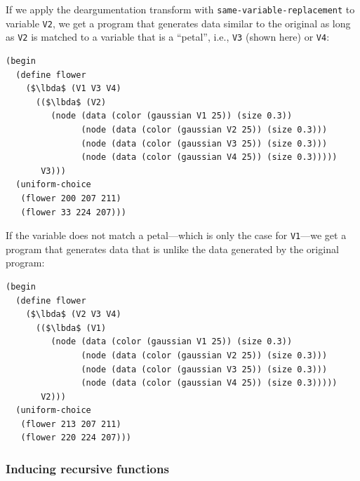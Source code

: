 \documentclass[a4paper,10pt]{article}
\newcommand{\lbda}{\color[rgb]{0,.3,.7} \lambda}
\begin{document}
If we apply the deargumentation transform with \texttt{same-variable-replacement} to variable \texttt{V2}, we get a program that generates data similar to the original as long as \texttt{V2} is matched to a variable that is a ``petal'', i.e., \texttt{V3} (shown here) or \texttt{V4}:

\begin{lstlisting}[mathescape=true]
(begin
  (define flower
    ($\lbda$ (V1 V3 V4)
      (($\lbda$ (V2)
         (node (data (color (gaussian V1 25)) (size 0.3))
               (node (data (color (gaussian V2 25)) (size 0.3)))
               (node (data (color (gaussian V3 25)) (size 0.3)))
               (node (data (color (gaussian V4 25)) (size 0.3)))))
       V3)))
  (uniform-choice
   (flower 200 207 211)
   (flower 33 224 207)))
\end{lstlisting}

If the variable does not match a petal---which is only the case for \texttt{V1}---we get a program that generates data that is unlike the data generated by the original program:

\begin{lstlisting}[mathescape=true]
(begin
  (define flower
    ($\lbda$ (V2 V3 V4)
      (($\lbda$ (V1)
         (node (data (color (gaussian V1 25)) (size 0.3))
               (node (data (color (gaussian V2 25)) (size 0.3)))
               (node (data (color (gaussian V3 25)) (size 0.3)))
               (node (data (color (gaussian V4 25)) (size 0.3)))))
       V2)))
  (uniform-choice
   (flower 213 207 211)
   (flower 220 224 207)))
\end{lstlisting}


\subsubsection{Inducing recursive functions}
\end{document}

